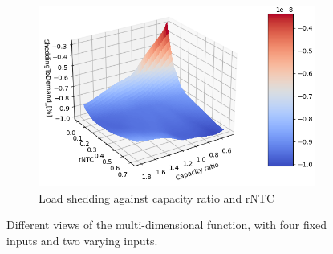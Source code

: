 \begin{figure}[h]
\begin{subfigure}[b]{0.49\textwidth}
        \includegraphics[width=\textwidth]{resources/images/view_0-5-1.png}
        \caption{Load shedding against capacity ratio and rNTC}
        \label{fig:surf-0-5-1}
    \end{subfigure}
    \caption{Different views of the multi-dimensional function, with four fixed inputs and two varying inputs.}
    \label{fig:all-views}
\end{figure}

